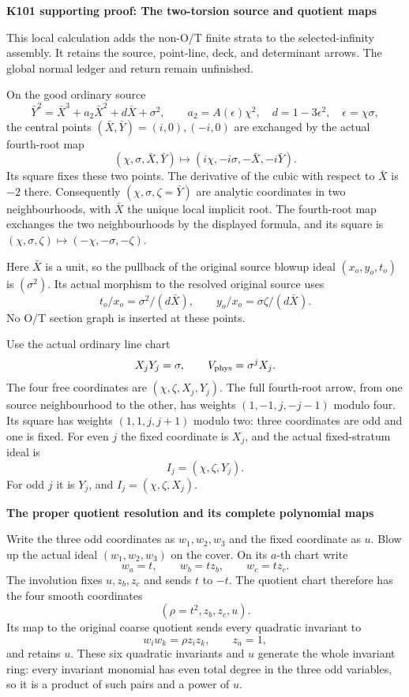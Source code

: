 \par\bigskip\noindent\textbf{K101 supporting proof: The two-torsion source and quotient maps}\par\nobreak
This local calculation adds the non-O/T finite strata to the selected-infinity assembly. It retains the source, point-line, deck, and determinant arrows. The global normal ledger and return remain unfinished.

On the good ordinary source
\[
 \bar Y^2=\bar X^3+a_2\bar X^2+d\bar X+\sigma^2,\qquad
 a_2=A(\epsilon)\chi^2,\quad d=1-3\epsilon^2,\quad
 \epsilon=\chi\sigma,
\]
the central points \((\bar X,\bar Y)=(i,0),(-i,0)\) are exchanged by
the actual fourth-root map
\[
 (\chi,\sigma,\bar X,\bar Y)\mapsto
       (i\chi,-i\sigma,-\bar X,-i\bar Y).
\]
Its square fixes these two points. The derivative of the cubic with
respect to \(\bar X\) is \(-2\) there. Consequently
\((\chi,\sigma,\zeta=\bar Y)\) are analytic coordinates in two
neighbourhoods, with \(\bar X\) the unique local implicit root.
The fourth-root map exchanges the two neighbourhoods by the displayed
formula, and its square is
\((\chi,\sigma,\zeta)\mapsto(-\chi,-\sigma,-\zeta)\).

Here \(\bar X\) is a unit, so the pullback of the original source blowup
ideal \((x_o,y_o,t_o)\) is \((\sigma^2)\). Its actual morphism to the
resolved original source uses
\[
 t_o/x_o=\sigma^2/(d\bar X),\qquad
 y_o/x_o=\sigma\zeta/(d\bar X).
\]
No O/T section graph is inserted at these points.

Use the actual ordinary line chart
\[
 X_jY_j=\sigma,\qquad V_{\rm phys}=\sigma^jX_j.
\]
The four free coordinates are \((\chi,\zeta,X_j,Y_j)\). The full
fourth-root arrow, from one source neighbourhood to the other, has
weights \((1,-1,j,-j-1)\) modulo four. Its square has weights
\((1,1,j,j+1)\) modulo two: three coordinates are odd and one is
fixed. For even \(j\) the fixed coordinate is \(X_j\), and the actual
fixed-stratum ideal is
\[
 I_j=(\chi,\zeta,Y_j).
\]
For odd \(j\) it is \(Y_j\), and \(I_j=(\chi,\zeta,X_j)\).

\par

\medskip\noindent\textbf{The proper quotient resolution and its complete polynomial maps}

\par\nobreak

Write the three odd coordinates as \(w_1,w_2,w_3\) and the fixed
coordinate as \(u\). Blow up the actual ideal
\((w_1,w_2,w_3)\) on the cover. On its \(a\)-th chart write
\[
 w_a=t,\qquad w_b=t z_b,\qquad w_c=t z_c.
\]
The involution fixes \(u,z_b,z_c\) and sends \(t\) to \(-t\).
The quotient chart therefore has the four smooth coordinates
\[
 (\rho=t^2,z_b,z_c,u).
\]
Its map to the original coarse quotient sends every quadratic
invariant to
\[
 w_iw_k=\rho z_i z_k,\qquad z_a=1,
\]
and retains \(u\). These six quadratic invariants and \(u\)
generate the whole invariant ring: every invariant monomial has even
total degree in the three odd variables, so it is a product of such
pairs and a power of \(u\).

